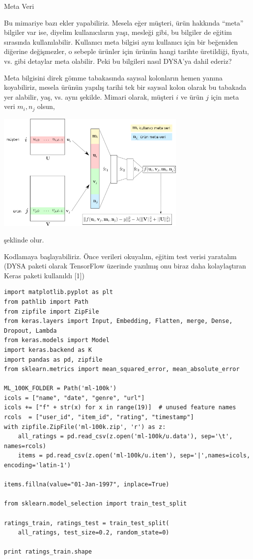\documentclass[12pt,fleqn]{article}\usepackage{../../common}
\begin{document}
Meta Veri

Bu mimariye bazı ekler yapabiliriz. Mesela eğer müşteri, ürün hakkında
``meta'' bilgiler var ise, diyelim kullanıcıların yaşı, mesleği gibi, bu
bilgiler de eğitim sırasında kullanılabilir.  Kullanıcı meta bilgisi aynı
kullanıcı için bir beğeniden diğerine değişmezler, o sebeple ürünler için
ürünün hangi tarihte üretildiği, fiyatı, vs. gibi detaylar meta
olabilir. Peki bu bilgileri nasıl DYSA'ya dahil ederiz?

Meta bilgisini direk gömme tabakasında sayısal kolonların hemen yanına
koyabiliriz, mesela ürünün yapılış tarihi tek bir sayısal kolon olarak bu
tabakada yer alabilir, yaş, vs. aynı şekilde. Mimari olarak, müşteri $i$ ve
ürün $j$ için meta veri $m_i,n_j$ olsun,

\includegraphics[width=25em]{recom_02.png}

şeklinde olur. 

Kodlamaya başlayabiliriz. Önce verileri okuyalım, eğitim test verisi
yaratalım (DYSA paketi olarak TensorFlow üzerinde yazılmış onu biraz daha
kolaylaştıran Keras paketi kullanıldı [1])

\begin{verbatim}
import matplotlib.pyplot as plt
from pathlib import Path
from zipfile import ZipFile
from keras.layers import Input, Embedding, Flatten, merge, Dense, Dropout, Lambda
from keras.models import Model
import keras.backend as K
import pandas as pd, zipfile
from sklearn.metrics import mean_squared_error, mean_absolute_error

ML_100K_FOLDER = Path('ml-100k')
icols = ["name", "date", "genre", "url"]
icols += ["f" + str(x) for x in range(19)]  # unused feature names
rcols  = ["user_id", "item_id", "rating", "timestamp"]
with zipfile.ZipFile('ml-100k.zip', 'r') as z:
    all_ratings = pd.read_csv(z.open('ml-100k/u.data'), sep='\t', names=rcols)
    items = pd.read_csv(z.open('ml-100k/u.item'), sep='|',names=icols, encoding='latin-1')
    
items.fillna(value="01-Jan-1997", inplace=True)

from sklearn.model_selection import train_test_split

ratings_train, ratings_test = train_test_split(
    all_ratings, test_size=0.2, random_state=0)

print ratings_train.shape
\end{verbatim}
\end{document}
